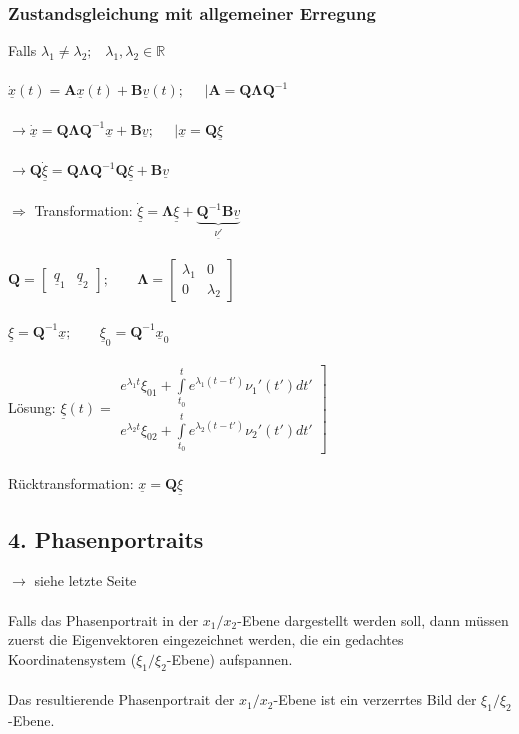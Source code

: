 \documentclass[a4paper,twocolumn,10pt]{article}
\begin{document}
\subsubsection*{Zustandsgleichung mit allgemeiner Erregung}
Falls $\lambda_1 \ne \lambda_2;\;\;\;\lambda_1,\lambda_2\in \mathbb{R}$\\\\
$\underline{\dot{x}}(t)=\textbf{A}\underline{x}(t)+\textbf{B}\underline{v}(t);\;\;\;\;\;| \textbf{A}=\textbf{Q}\mathbf{\Lambda} \textbf{Q}^{-1}$\\\\
$\rightarrow\underline{\dot{x}}=\textbf{Q}\mathbf{\Lambda} \textbf{Q}^{-1}\underline{x}+\textbf{B}\underline{v};\;\;\;\;\;|\underline{x}=\textbf{Q}\underline{\xi}$\\\\
$\rightarrow\textbf{Q}\underline{\dot\xi}=\textbf{Q}\mathbf{\Lambda} \textbf{Q}^{-1}\textbf{Q}\underline{\xi}+\textbf{B}\underline{v}$\\\\
$\Rightarrow$ Transformation: $\underline{\dot{\xi}} =\mathbf{\Lambda}\underline{\xi}+\underbrace{\textbf{Q}^{-1}\textbf{B}\underline{v}}_{\underline{\nu'}}$\\\\
$\textbf{Q}=\begin{bmatrix}\underline{q}_1 & \underline{q}_2\end{bmatrix};\;\;\;\;\;\;\;\mathbf{\Lambda} =\begin{bmatrix}\lambda_1 & 0 \\ 0 & \lambda_2\end{bmatrix}$\\\\
$\underline{\xi} =\textbf{Q}^{-1}\underline{x};\;\;\;\;\;\;\;\underline{\xi}_0 =\textbf{Q}^{-1}\underline{x}_0$\\\\
Lösung: $\underline{\xi} (t)=\left.\begin{matrix}e^{\lambda_1 t}\xi_{01}+\int\limits_{t_0}^{t}e^{\lambda_1(t-t')}\nu_1'(t')dt' \\ e^{\lambda_2 t}\xi_{02}+\int\limits_{t_0}^{t}e^{\lambda_2(t-t')}\nu_2'(t')dt'\end{matrix}\right]$\\\\
Rücktransformation: $\underline{x}=\textbf{Q}\underline{\xi}$

\subsection*{4. Phasenportraits}
$\rightarrow$ siehe letzte Seite\\\\
Falls das Phasenportrait in der $x_1/x_2$-Ebene dargestellt werden soll, dann müssen zuerst die Eigenvektoren eingezeichnet werden, die ein gedachtes Koordinatensystem ($\xi_1/\xi_2$-Ebene) aufspannen.\\\\
Das resultierende Phasenportrait der $x_1/x_2$-Ebene ist ein verzerrtes Bild der $\xi_1/\xi_2$-Ebene.
\end{document}
